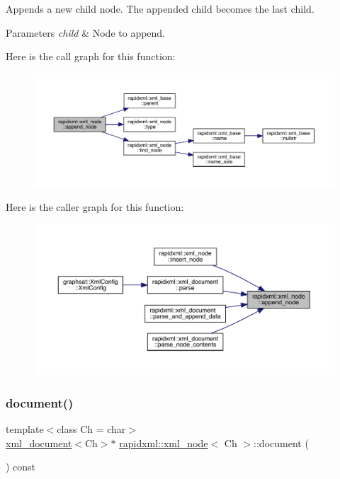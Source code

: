 Appends a new child node. The appended child becomes the last child. 
\begin{DoxyParams}{Parameters}
{\em child} & Node to append. \\
\hline
\end{DoxyParams}
Here is the call graph for this function\+:\nopagebreak
\begin{figure}[H]
\begin{center}
\leavevmode
\includegraphics[width=350pt]{classrapidxml_1_1xml__node_a8696d098ecc9c4d2a646b43e91d58e31_cgraph}
\end{center}
\end{figure}
Here is the caller graph for this function\+:\nopagebreak
\begin{figure}[H]
\begin{center}
\leavevmode
\includegraphics[width=350pt]{classrapidxml_1_1xml__node_a8696d098ecc9c4d2a646b43e91d58e31_icgraph}
\end{center}
\end{figure}
\mbox{\label{classrapidxml_1_1xml__node_af23d2d56182411e9261ca6974bfd767f}} 
\subsubsection{\texorpdfstring{document()}{document()}}
{\footnotesize\ttfamily template$<$class Ch = char$>$ \\
\mbox{\hyperlink{classrapidxml_1_1xml__document}{xml\+\_\+document}}$<$Ch$>$$\ast$ \mbox{\hyperlink{classrapidxml_1_1xml__node}{rapidxml\+::xml\+\_\+node}}$<$ Ch $>$\+::document (\begin{DoxyParamCaption}{ }\end{DoxyParamCaption}) const\hspace{0.3cm}{\ttfamily [inline]}}

